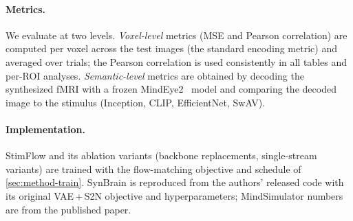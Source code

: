 \documentclass[runningheads]{llncs}
\begin{document}
\paragraph{Metrics.}
We evaluate at two levels.
\emph{Voxel-level} metrics (MSE and Pearson correlation) are
computed per voxel across the test images (the standard encoding metric) and averaged over
trials; the Pearson correlation is used consistently in all tables and per-ROI analyses.
\emph{Semantic-level} metrics are obtained by decoding the synthesized fMRI with a
frozen MindEye2~\cite{mindeye2} model and comparing the decoded image to the stimulus
(Inception, CLIP, EfficientNet, SwAV).

\paragraph{Implementation.}
StimFlow and its ablation variants (backbone replacements, single-stream variants) are trained
with the flow-matching objective and schedule of \cref{sec:method-train}. SynBrain is reproduced
from the authors' released code with its original VAE\,+\,S2N objective and hyperparameters;
MindSimulator numbers are from the published paper.
\end{document}

